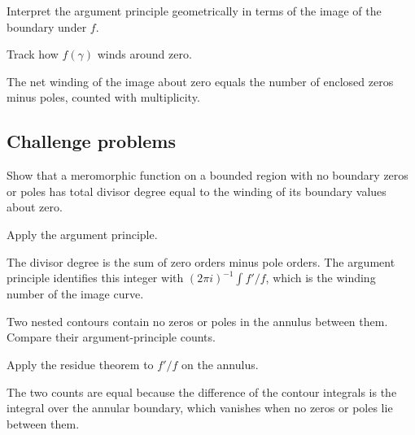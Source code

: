 \begin{exercise}\label{exr:iv12-expand-14}
Interpret the argument principle geometrically in terms of the image of the boundary under \(f\).
\end{exercise}
\begin{hint}
Track how \(f(\gamma)\) winds around zero.
\end{hint}
\begin{solution}
The net winding of the image about zero equals the number of enclosed zeros minus poles, counted with multiplicity.
\end{solution}

\subsection*{Challenge problems}

\begin{exercise}\label{exr:iv12-expand-15}
Show that a meromorphic function on a bounded region with no boundary zeros or poles has total divisor degree equal to the winding of its boundary values about zero.
\end{exercise}
\begin{hint}
Apply the argument principle.
\end{hint}
\begin{solution}
The divisor degree is the sum of zero orders minus pole orders. The argument principle identifies this integer with \((2\pi i)^{-1}\int f'/f\), which is the winding number of the image curve.
\end{solution}

\begin{exercise}\label{exr:iv12-expand-16}
Two nested contours contain no zeros or poles in the annulus between them. Compare their argument-principle counts.
\end{exercise}
\begin{hint}
Apply the residue theorem to \(f'/f\) on the annulus.
\end{hint}
\begin{solution}
The two counts are equal because the difference of the contour integrals is the integral over the annular boundary, which vanishes when no zeros or poles lie between them.
\end{solution}

